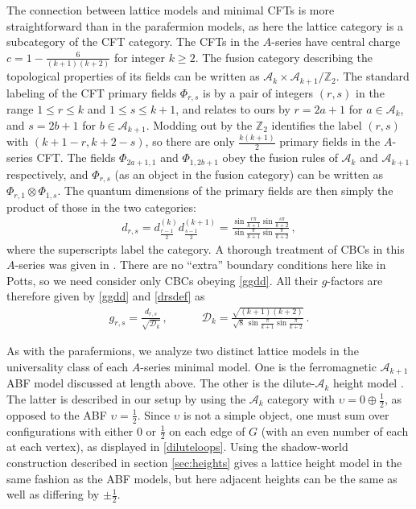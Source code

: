 The connection between lattice models and minimal CFTs is more straightforward than in the parafermion models, as here the lattice category is a subcategory of the CFT category.
The CFTs in the $A$-series  %
have central charge $c=1 - \frac{6}{(k+1)(k+2)}$ for integer $k\ge 2$.  The fusion category describing the topological properties of its fields can be written as $\mathcal{A}_k \times \mathcal{A}_{k+1} / \mathbb{Z}_2$.
The standard labeling of the CFT primary fields $\Phi_{r,s}$ is by a pair of integers $(r,s)$ in the range $1 \leq r \leq k$ and $1 \leq s \leq k+1$, and relates to ours by $r=2a+1$ for $a \in \mathcal{A}_{k}$, and $s = 2b+1$ for $b \in \mathcal{A}_{k+1}$. Modding out by the $\mathbb{Z}_2$ identifies the 
label $(r,s)$ with $(k+1-r,k+2-s)$, so there are only $\tfrac{k(k+1)}{2}$ primary fields in the $A$-series CFT.
The fields $\Phi_{2a+1,1}$ and $\Phi_{1,2b+1}$ obey the fusion rules of $\mathcal{A}_{k}$ and $\mathcal{A}_{k+1}$ respectively, and $\Phi_{r,s}$ (as an object in the fusion category) can be written as $\Phi_{r,1} \otimes \Phi_{1,s}$. The quantum dimensions of the primary fields are then simply the product of those in the two categories:
\begin{align}
	d_{r,s} = d_{\frac{r-1}2}^{(k)}d_{\frac{s-1}2}^{(k+1)} = \frac{ \sin\frac{r\pi}{k+1} \sin\frac{s\pi}{k+2} }{ \sin\frac{\pi}{k+1} \sin\frac{\pi}{k+2} } \,,
\label{drsdef}
\end{align}
where the superscripts label the category.
A thorough treatment of CBCs in this $A$-series was given in \cite{Behrend1999}. 
There are no ``extra'' boundary conditions here like in Potts, so we need consider only CBCs obeying \eqref{ggdd}.
All their $g$-factors are therefore given by \eqref{ggdd} and \eqref{drsdef} as
\begin{align}
	g_{r,s}=\frac{d_{r,s}}{\sqrt{\mathscr{D}_k}}\,,\qquad\quad
	\mathscr{D}_{k} = \frac{\sqrt{(k+1)(k+2)}}{\sqrt{8} \, \sin\frac{\pi}{k+1}\sin\frac{\pi}{k+2}} \,.
\label{gmin}
\end{align}


As with the parafermions, we analyze two distinct lattice models in the universality class of each $A$-series minimal model. One is the ferromagnetic $\mathcal{A}_{k+1}$ ABF model discussed at length above.
The other is the dilute-$\mathcal{A}_k$ height model \cite{Warnaar1992}.
The latter is described in our setup by  using the $\mathcal{A}_k$ category with $\upsilon=0\oplus \frac{1}{2}$, as opposed to the ABF $\upsilon=\frac12$.
Since $\upsilon$ is not a simple object, one must sum over configurations with either $0$ or $\frac12$ on each edge of $G$ (with an even number of each at each vertex), as displayed in \eqref{diluteloops}.
Using the shadow-world construction described in section \ref{sec:heights} gives a lattice height model in the same fashion as the ABF models, but here adjacent heights can be the same as well as differing by $\pm \frac12$.  

